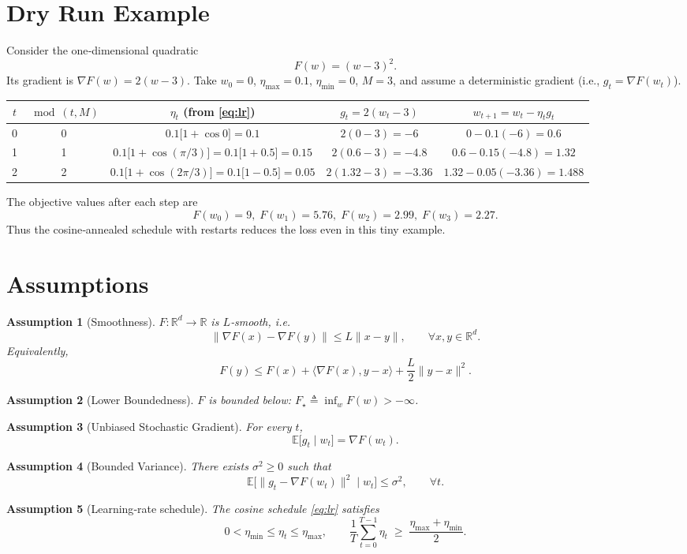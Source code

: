 \documentclass{article}
\newtheorem{assumption}{Assumption}
\newcommand{\EE}{\mathbb{E}}
\newcommand{\RR}{\mathbb{R}}
\begin{document}
\section*{Dry Run Example}
Consider the one‑dimensional quadratic
\[
F(w)= (w-3)^2 .
\]
Its gradient is $\nabla F(w)=2(w-3)$.  
Take $w_0=0$, $\eta_{\max}=0.1$, $\eta_{\min}=0$, $M=3$, and assume a deterministic
gradient (i.e., $g_t=\nabla F(w_t)$).  

\begin{center}
\begin{tabular}{c|c|c|c|c}
$t$ & $\bmod(t,M)$ & $\eta_t$ (from \eqref{eq:lr}) & $g_t=2(w_t-3)$ & $w_{t+1}=w_t-\eta_t g_t$ \\ \hline
0 & 0 & $0.1\bigl[1+\cos 0\bigr]=0.1$ & $2(0-3)=-6$ & $0-0.1(-6)=0.6$ \\[1mm]
1 & 1 & $0.1\bigl[1+\cos(\pi/3)\bigr]=0.1\bigl[1+0.5\bigr]=0.15$ & $2(0.6-3)=-4.8$ & $0.6-0.15(-4.8)=1.32$ \\[1mm]
2 & 2 & $0.1\bigl[1+\cos(2\pi/3)\bigr]=0.1\bigl[1-0.5\bigr]=0.05$ & $2(1.32-3)=-3.36$ & $1.32-0.05(-3.36)=1.488$ 
\end{tabular}
\end{center}
The objective values after each step are
\[
F(w_0)=9,\;F(w_1)=5.76,\;F(w_2)=2.99,\;F(w_3)=2.27 .
\]
Thus the cosine‑annealed schedule with restarts reduces the loss even in this tiny
example.

\newpage
\section*{Assumptions}
\begin{assumption}[Smoothness]\label{ass:smooth}
$F:\RR^d\to\RR$ is $L$‑smooth, i.e.
\[
\|\nabla F(x)-\nabla F(y)\|\le L\|x-y\|,\qquad\forall x,y\in\RR^d .
\]
Equivalently,
\[
F(y)\le F(x)+\langle\nabla F(x),y-x\rangle+\frac{L}{2}\|y-x\|^2 .
\tag{3}
\]
\end{assumption}
\begin{assumption}[Lower Boundedness]\label{ass:lb}
$F$ is bounded below: $F_\star\triangleq\inf_{w}F(w)>-\infty$.
\end{assumption}
\begin{assumption}[Unbiased Stochastic Gradient]\label{ass:unbiased}
For every $t$, 
\[
\EE\bigl[g_t\mid w_t\bigr]=\nabla F(w_t).
\]
\end{assumption}
\begin{assumption}[Bounded Variance]\label{ass:variance}
There exists $\sigma^2\ge0$ such that
\[
\EE\bigl[\|g_t-\nabla F(w_t)\|^2\mid w_t\bigr]\le\sigma^2,\qquad\forall t .
\]
\end{assumption}
\begin{assumption}[Learning‑rate schedule]\label{ass:lr}
The cosine schedule \eqref{eq:lr} satisfies
\[
0<\eta_{\min}\le\eta_t\le\eta_{\max},\qquad 
\frac{1}{T}\sum_{t=0}^{T-1}\eta_t\;\ge\;\frac{\eta_{\max}+\eta_{\min}}{2}.
\]
\end{assumption}
\end{document}
